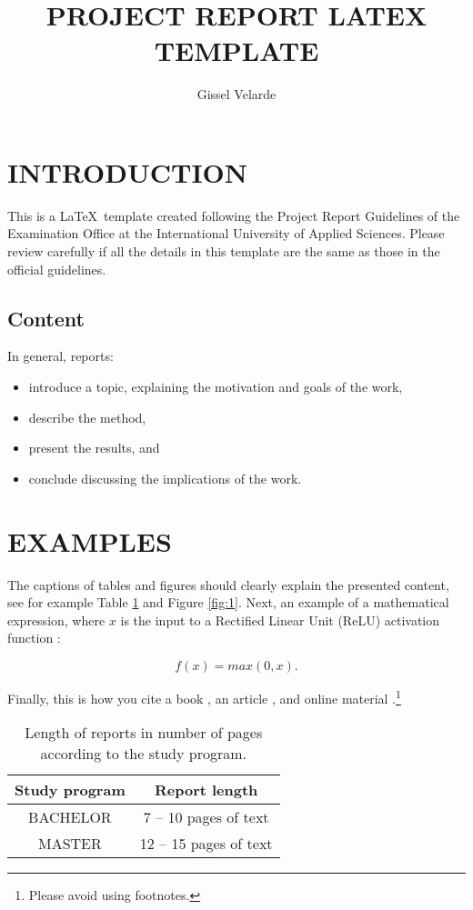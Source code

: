 \documentclass[11pt,a4paper]{article}
\title{PROJECT REPORT LATEX TEMPLATE}
\author{ Gissel Velarde }
\begin{document}
\maketitle	

 \tableofcontents
 \pagebreak

\section{INTRODUCTION}
This is a \LaTeX\  template created following the Project Report Guidelines of the Examination Office at the International University of Applied Sciences. Please review carefully if all the details in this template are the same as those in the official guidelines. 

\subsection{Content}
In general, reports:

\begin{itemize}
\item introduce a topic, explaining the motivation and goals of the work, 
\item describe the method, 
\item  present the results, and
\item conclude discussing the implications of the work.
\end{itemize}

\section{EXAMPLES}
The captions of tables and figures should clearly explain the presented content, see for example Table \ref{table:1} and Figure \ref{fig:1}. Next, an example of a mathematical expression, where $x$ is the input to a Rectified Linear Unit (ReLU) activation function :

\begin{equation} \label{e:1}
f(x)=max(0,x). 
\end{equation}

Finally, this is how you cite a book \cite{velarde2023artificial}, an article \cite{lecun1989handwritten}, and online material \cite{Stutz2022}.\footnote{Please avoid using footnotes.} 

\begin{table}[h!]
\centering
\begin{tabular}{|c c|} 
 \hline
Study program &  Report length \\  \hline
BACHELOR &  7 -- 10  pages of text  \\ 
MASTER  & 12 -- 15 pages of text\\

 \hline
\end{tabular}
\caption{Length of reports in number of pages according to the study program.}
\label{table:1}
\end{table}
\end{document}
